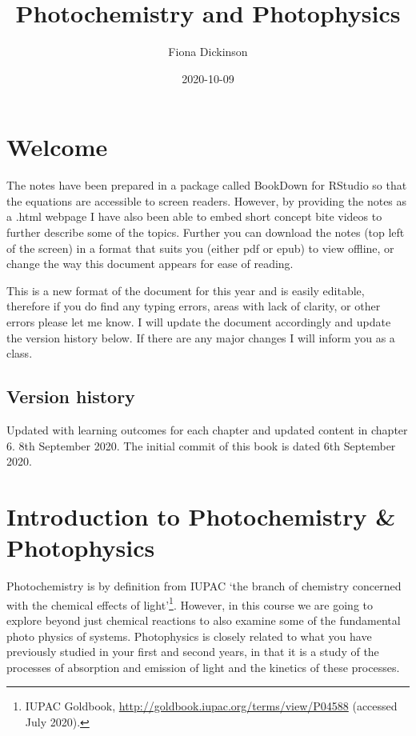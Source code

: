 \documentclass[
]{book}
\title{Photochemistry and Photophysics}
\author{Fiona Dickinson}
\date{2020-10-09}
\begin{document}
\maketitle

{
\setcounter{tocdepth}{1}
\tableofcontents
}
\hypertarget{welcome}{%
\chapter*{Welcome}\label{welcome}}

The notes have been prepared in a package called BookDown for RStudio so that the equations are accessible to screen readers. However, by providing the notes as a .html webpage I have also been able to embed short concept bite videos to further describe some of the topics. Further you can download the notes (top left of the screen) in a format that suits you (either pdf or epub) to view offline, or change the way this document appears for ease of reading.

This is a new format of the document for this year and is easily editable, therefore if you do find any typing errors, areas with lack of clarity, or other errors please let me know. I will update the document accordingly and update the version history below. If there are any major changes I will inform you as a class.

\hypertarget{version-history}{%
\section*{Version history}\label{version-history}}

Updated with learning outcomes for each chapter and updated content in chapter 6. 8th September 2020.
The initial commit of this book is dated 6th September 2020.

\hypertarget{ch:Intro}{%
\chapter{Introduction to Photochemistry \& Photophysics}\label{ch:Intro}}

Photochemistry is by definition from IUPAC `the branch of chemistry concerned with the chemical effects of light'\footnote{IUPAC Goldbook, \url{http://goldbook.iupac.org/terms/view/P04588} (accessed July 2020).}. However, in this course we are going to explore beyond just chemical reactions to also examine some of the fundamental photo physics of systems. Photophysics is closely related to what you have previously studied in your first and second years, in that it is a study of the processes of absorption and emission of light and the kinetics of these processes.
\end{document}
